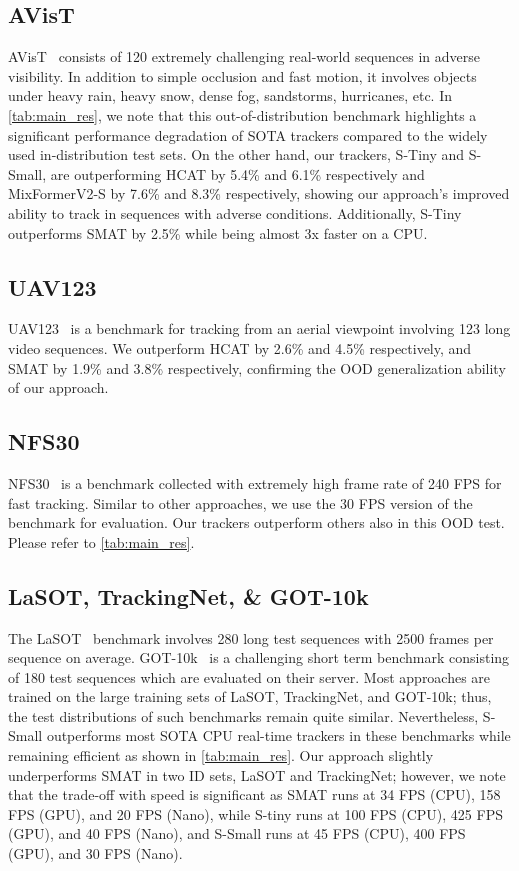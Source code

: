   
  \subsection{AVisT} 



  AVisT~\cite{noman2022avist} consists of 120 extremely challenging real-world sequences in adverse visibility.
  In addition to simple occlusion and fast motion, it involves objects under heavy rain, heavy snow, dense fog, sandstorms, hurricanes, etc. In \ref{tab:main_res}, we note that this out-of-distribution benchmark highlights a significant performance degradation of SOTA trackers compared to the widely used in-distribution test sets. On the other hand, our trackers, S-Tiny and S-Small, are outperforming HCAT by 5.4\% and 6.1\% respectively and MixFormerV2-S\cite{cui2024mixformerv2} by 7.6\% and 8.3\% respectively, showing our approach's improved ability to track in sequences with adverse conditions. Additionally, S-Tiny outperforms SMAT\cite{gopal2024separable} by 2.5\% while being almost 3x faster on a CPU.
  
  \subsection{UAV123}
  UAV123~\cite{mueller2016benchmark}  is a benchmark for tracking from an aerial viewpoint involving 123 long video sequences. We outperform HCAT by 2.6\% and 4.5\% respectively, and SMAT by 1.9\% and 3.8\% respectively, confirming the OOD generalization ability of our approach.


  \subsection{NFS30}
  NFS30~\cite{kiani2017need}  is a benchmark collected with extremely high frame rate of 240 FPS for fast tracking. Similar to other approaches, we use the 30 FPS version of the benchmark for evaluation. Our trackers outperform others also in this OOD test. Please refer to \ref{tab:main_res}.
  

  \subsection{LaSOT, TrackingNet, \& GOT-10k}
  The LaSOT~\cite{fan2021lasot} benchmark involves 280 long test sequences with 2500 frames per sequence on average.
  GOT-10k~\cite{Huang2021} is a challenging short term benchmark consisting of 180 test sequences which are evaluated on their server. Most approaches are trained on the large training sets of LaSOT, TrackingNet, and GOT-10k; thus, the test distributions of such benchmarks remain quite similar. 
  Nevertheless, S-Small outperforms most SOTA CPU real-time trackers in these benchmarks while remaining efficient as shown in \ref{tab:main_res}. Our approach slightly underperforms SMAT
  in two ID sets, LaSOT and TrackingNet; however, we note that the trade-off with speed is significant as SMAT runs at 34 FPS (CPU), 158 FPS (GPU), and 20 FPS (Nano), while S-tiny runs at 100 FPS (CPU), 425 FPS (GPU), and 40 FPS (Nano), and S-Small runs at 45 FPS (CPU), 400 FPS (GPU), and 30 FPS (Nano). 
  
